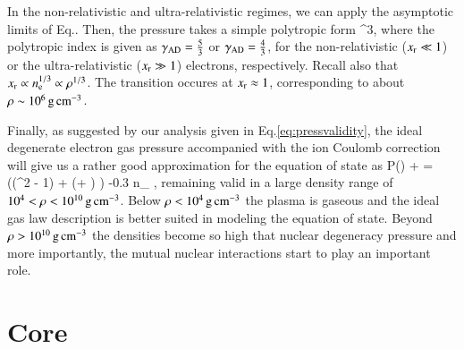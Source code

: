 In the non-relativistic and ultra-relativistic regimes, we can apply the asymptotic limits of Eq..
Then, the pressure  takes a simple polytropic form
\be
\Peid \approx \frac{ \Pressr }{9\pi^2 \gammaad} \xr^{3\gammaad},
\ee
where the polytropic index is given as $\gamma_{\mathrm{AD}} = \frac{5}{3}$ or $\gamma_{\mathrm{AD}} = \frac{4}{3}$, for the non-relativistic ($x_{\mathrm{r}} \ll 1$) or the ultra-relativistic ($x_{\mathrm{r}} \gg 1$) electrons, respectively.
Recall also that $x_{\mathrm{r}} \propto n_{\mathrm{e}}^{1/3} \propto \rho^{1/3}$.
The transition occures at $x_{\mathrm{r}} \approx 1$, corresponding to about $\rho \sim 10^6 \, \mathrm{g}\,\mathrm{cm}^{-3}$.

Finally, as suggested by our analysis given in Eq.\eqref{eq:pressvalidity}, the ideal degenerate electron gas pressure accompanied with the ion Coulomb correction will give us a rather good approximation for the equation of state as %
\be
P(\xr) \approx \Peid + \Pii =  \left(\xr (\xr^2 - 1) \gammar + \ln(\xr + \gammar) \right) -0.3 n_{} ,
\ee
remaining valid in a large density range of $10^{4} < \rho < 10^{10} \, \mathrm{g}\,\mathrm{cm}^{-3}$.
Below $\rho < 10^{4} \, \mathrm{g}\,\mathrm{cm}^{-3}$ the plasma is gaseous and the ideal gas law description  is better suited in modeling the equation of state.
Beyond $\rho > 10^{10} \, \mathrm{g}\,\mathrm{cm}^{-3}$ the densities become so high that nuclear degeneracy pressure and more importantly, the mutual nuclear interactions start to play an important role.


%







\section{Core}\label{sect:core}

